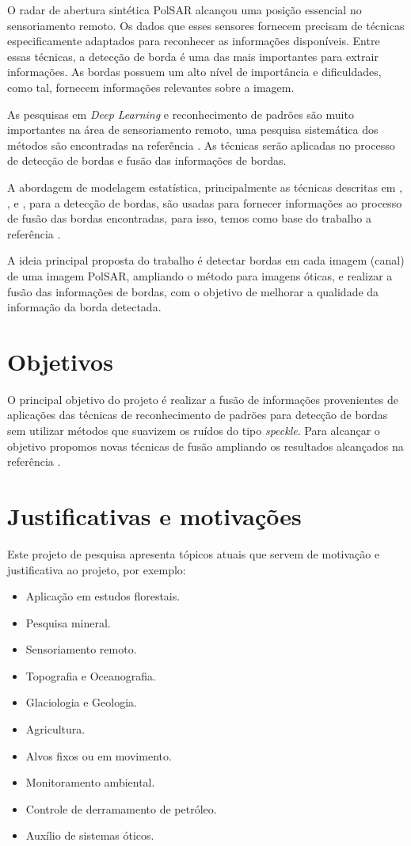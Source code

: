 \documentclass[runningheads]{llncs}
\begin{document}
O radar de abertura sintética PolSAR alcançou uma posição essencial no sensoriamento remoto. Os dados que esses sensores fornecem precisam de técnicas especificamente adaptados para reconhecer as informações disponíveis. Entre essas técnicas, a detecção de borda é uma das mais importantes para extrair informações. As bordas possuem um alto nível de importância e dificuldades, como tal, fornecem informações relevantes sobre a imagem.

As pesquisas em \textit{Deep Learning} e reconhecimento de padrões são muito importantes na área de sensoriamento remoto, uma pesquisa sistemática dos métodos são encontradas na referência \cite{ztmxzxf}. 
As técnicas serão aplicadas no processo de detecção de bordas e fusão das informações de bordas. 

A abordagem de modelagem estatística, principalmente as técnicas descritas em \cite{bmf_2020}, \cite{nhfc},  e \cite{ref_proc3}, para a detecção de bordas, são usadas para fornecer informações ao processo de fusão das bordas encontradas, para isso, temos como base do trabalho a referência \cite{ref_proc4}. 

A ideia principal proposta do trabalho é detectar bordas em cada imagem (canal) de uma imagem PolSAR, ampliando o método para imagens óticas, e realizar a fusão das informações de bordas, com o objetivo de melhorar a qualidade da informação da borda detectada.

\section{Objetivos}

O principal objetivo do projeto é realizar a fusão de informações provenientes de aplicações das técnicas de reconhecimento de padrões para detecção de bordas sem utilizar métodos que suavizem os ruídos do tipo \textit{speckle}. Para alcançar o objetivo propomos novas técnicas de fusão ampliando os resultados alcançados na referência \cite{bmf_2020}.

\section{Justificativas e motivações}
Este projeto de pesquisa apresenta tópicos atuais que servem de motivação e justificativa ao projeto, por exemplo:
\begin{itemize}
\item Aplicação em estudos florestais.
\item Pesquisa mineral.
\item Sensoriamento remoto.
\item Topografia e Oceanografia.
\item Glaciologia e Geologia.
\item Agricultura.
\item Alvos fixos ou em movimento.
\item Monitoramento ambiental.
\item Controle de derramamento de petróleo.
\item Auxílio de sistemas óticos.
\end{itemize}
\end{document}
